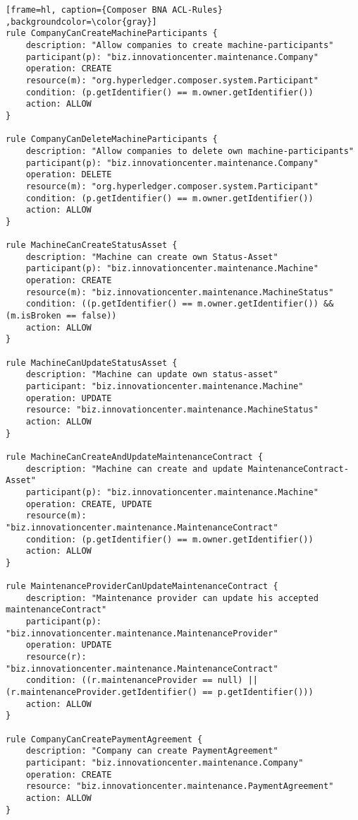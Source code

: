 \begin{appendices}
\begin{lstlisting}[frame=hl, caption={Composer BNA ACL-Rules} ,backgroundcolor=\color{gray}]
rule CompanyCanCreateMachineParticipants {
    description: "Allow companies to create machine-participants"
    participant(p): "biz.innovationcenter.maintenance.Company"
    operation: CREATE
    resource(m): "org.hyperledger.composer.system.Participant"
    condition: (p.getIdentifier() == m.owner.getIdentifier())
    action: ALLOW
}

rule CompanyCanDeleteMachineParticipants {
    description: "Allow companies to delete own machine-participants"
    participant(p): "biz.innovationcenter.maintenance.Company"
    operation: DELETE
    resource(m): "org.hyperledger.composer.system.Participant"
    condition: (p.getIdentifier() == m.owner.getIdentifier())
    action: ALLOW
}

rule MachineCanCreateStatusAsset {
    description: "Machine can create own Status-Asset"
    participant(p): "biz.innovationcenter.maintenance.Machine"
    operation: CREATE
    resource(m): "biz.innovationcenter.maintenance.MachineStatus"
    condition: ((p.getIdentifier() == m.owner.getIdentifier()) && (m.isBroken == false))
    action: ALLOW
}

rule MachineCanUpdateStatusAsset {
    description: "Machine can update own status-asset"
    participant: "biz.innovationcenter.maintenance.Machine"
    operation: UPDATE
    resource: "biz.innovationcenter.maintenance.MachineStatus"
    action: ALLOW
}

rule MachineCanCreateAndUpdateMaintenanceContract {
    description: "Machine can create and update MaintenanceContract-Asset"
    participant(p): "biz.innovationcenter.maintenance.Machine"
    operation: CREATE, UPDATE
    resource(m): "biz.innovationcenter.maintenance.MaintenanceContract"
    condition: (p.getIdentifier() == m.owner.getIdentifier())
    action: ALLOW
}

rule MaintenanceProviderCanUpdateMaintenanceContract {
    description: "Maintenance provider can update his accepted maintenanceContract"
    participant(p): "biz.innovationcenter.maintenance.MaintenanceProvider"
    operation: UPDATE
    resource(r): "biz.innovationcenter.maintenance.MaintenanceContract"
    condition: ((r.maintenanceProvider == null) || (r.maintenanceProvider.getIdentifier() == p.getIdentifier()))
    action: ALLOW
}

rule CompanyCanCreatePaymentAgreement {
    description: "Company can create PaymentAgreement"
    participant: "biz.innovationcenter.maintenance.Company"
    operation: CREATE
    resource: "biz.innovationcenter.maintenance.PaymentAgreement"
    action: ALLOW
}


\end{lstlisting}
\end{appendices}
